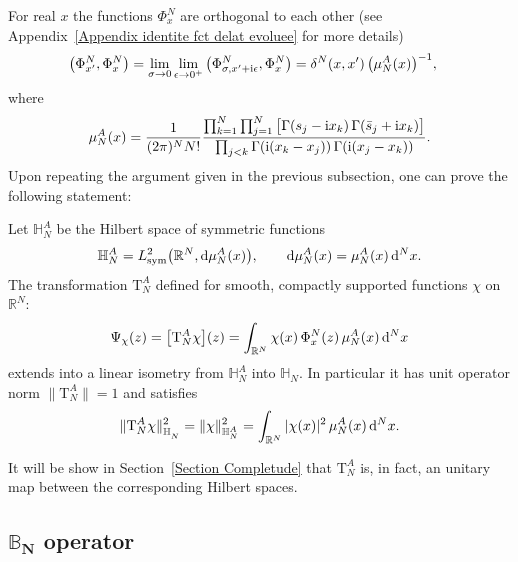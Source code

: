  For real $x$ the functions $\Phi^N_{ x}$ are orthogonal to
each other (see Appendix~\ref{Appendix identite fct delat evoluee} for more details)
\begin{align}\label{PhiAort}
 \big(\Phi^N_{ x'}, \Phi^N_{ x}\big) &=\lim_{\sigma\to0}\lim_{\epsilon\to 0^+}\big(\Phi^N_{\sigma, x'+{\rm i}\epsilon}, \Phi^N_x\big)
 =\delta^N( x,x')\, \big(\mu_N^A( x)\big)^{-1},
\end{align}
where
\begin{gather*}%
 \mu_N^A( x) = \frac1{(2\pi)^N N!}
 \frac{\prod_{k=1}^{N}\prod_{j=1}^N\big[\Gamma( s_j-{\rm i}x_k)\,\Gamma(\bar s_j+{\rm i}x_k)\big]}
 {\prod_{j< k} \Gamma({\rm i}(x_k-x_j))\,\Gamma({\rm i}(x_j-x_k))}.
\end{gather*}
Upon repeating the argument given in the previous subsection, one can prove the following statement:

\begin{Theorem}
Let $\mathbb H_N^A$ be the Hilbert space of symmetric functions
\begin{gather*}
\mathbb H_N^A =L^2_{\rm sym}\big(\mathbb R^N, {\rm d}\mu^A_N(x)\big),\qquad
{\rm d}\mu^A_N(x)=\mu^A_N(x)\, {\rm d}^Nx.
\end{gather*}
The transformation $\mathrm T_N^{A}$ defined for smooth, compactly supported functions $\chi$ on $\mathbb{R}^N{:}$
\begin{gather}\label{A-map}
\Psi_{\chi}(z)=\big[\mathrm T_N^A\chi\big](z)
=\int_{\mathbb R^{N}} \chi(x)\, \Phi^N_{{x}}( z)\, \mu_{N}^{A}( x)\, {\rm d}^{N} x
\end{gather}
extends into a linear isometry from $\mathbb H_N^A$ into $\mathbb H_N$. In particular it has unit operator norm $\big\|\mathrm T_{N}^{A}\big\|=1$
and satisfies
\begin{gather*}
\|\mathrm T_N^A\chi\|^2_{\mathbb H_N^{\phantom{A}}} = \| \chi\|^2_{\mathbb H_N^{A}} = \int_{\mathbb R^{N}} |\chi( x)|^2\, \mu_{N}^{A}( x)\, {\rm d}^{N} x.
\end{gather*}
\end{Theorem}

It will be show in Section~\ref{Section Completude} that $\mathrm T_N^A$ is, in fact, an unitary map between the corresponding Hilbert
spaces.

\subsection[BN operator]{$\boldsymbol{\mathbb B_N}$ operator}%

